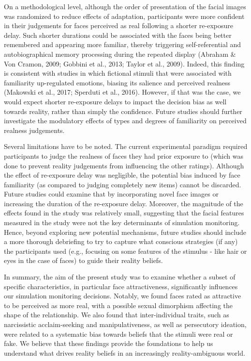 \documentclass[
  man,mask,floatsintext]{apa6}
\begin{document}
On a methodological level, although the order of presentation of the facial images was randomized to reduce effects of adaptation, participants were more confident in their judgements for faces perceived as real following a shorter re-exposure delay. Such shorter durations could be associated with the faces being better remembered and appearing more familiar, thereby triggering self-referential and autobiographical memory processing during the repeated display (Abraham \& Von Cramon, 2009; Gobbini et al., 2013; Taylor et al., 2009). Indeed, this finding is consistent with studies in which fictional stimuli that were associated with familiarity up-regulated emotions, biasing its salience and perceived realness (Makowski et al., 2017; Sperduti et al., 2016). However, if that was the case, we would expect shorter re-exposure delays to impact the decision bias as well towards reality, rather than simply the confidence. Future studies should further investigate the modulatory effects of types and degrees of familiarity on perceived realness judgements.

Several limitations have to be noted. The current experimental paradigm required participants to judge the realness of faces they had prior exposure to (which was done to prevent reality judgements from influencing the other ratings). Although the effect of re-exposure delay was negligible, the potential bias induced by face familiarity (as compared to judging completely new items) cannot be discarded. Future studies could examine that by incorporating novel face images or increasing the duration of the re-exposure delay. Moreover, the magnitude of the effects found in the study was relatively small, suggesting that the facial features measured in the study were not the key determinants of simulation monitoring. Hence, beyond exploring new potential mechanisms, future studies should include a more thorough debriefing to try to capture what conscious strategies (if any) the participants used (e.g., focusing on some features of the stimulus - like hair or eyes in the case of faces) to guide their reality beliefs.

In summary, the aim of the present study was to examine whether a subset of specific characteristics, in particular face attractiveness, significantly influences our simulation monitoring decisions. Notably, we found faces rated as attractive to be perceived as more real, with a possible sexual dimorphism affecting the shape of the relationship. We also found that inter-individual traits, such as narcissistic acclaim-seeking and manipulativeness, as well as persecutory ideation, were related to a systematic bias towards beliefs that the stimuli were real or fake. We believe that these findings provide the foundations to help us understand what drives reality beliefs in an increasingly reality-ambiguous world.
\end{document}

